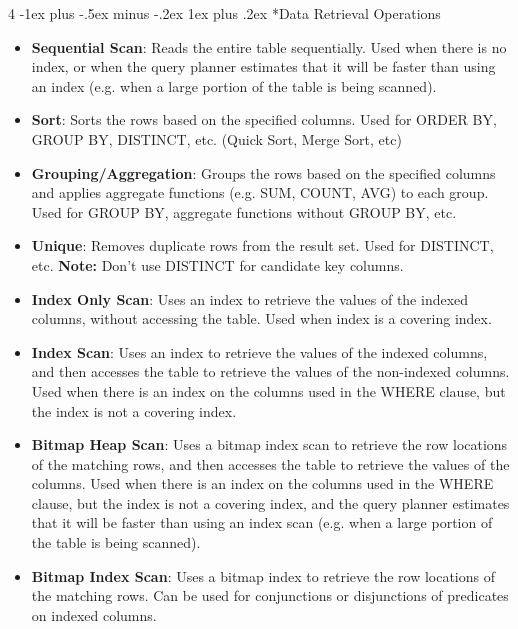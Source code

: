 \documentclass[10pt, landscape]{article}
\makeatletter
\renewcommand{\subsubsection}{\@startsection{subsubsection}{3}{0mm}%
  {-1ex plus -.5ex minus -.2ex}%
  {1ex plus .2ex}%
{\normalfont\small\bfseries}}%
\makeatother
\begin{document}
\begin{multicols*}{4}
  \subsubsection*{Data Retrieval Operations}
  \begin{itemize}
    \item \textbf{Sequential Scan}: Reads the entire table sequentially. Used when there is no index, or when the query planner estimates that it will be faster than using an index (e.g. when a large portion of the table is being scanned).
    \item \textbf{Sort}: Sorts the rows based on the specified columns. Used for ORDER BY, GROUP BY, DISTINCT, etc. (Quick Sort, Merge Sort, etc)
    \item \textbf{Grouping/Aggregation}: Groups the rows based on the specified columns and applies aggregate functions (e.g. SUM, COUNT, AVG) to each group. Used for GROUP BY, aggregate functions without GROUP BY, etc.
    \item \textbf{Unique}: Removes duplicate rows from the result set. Used for DISTINCT, etc. \textbf{Note:} Don't use DISTINCT for candidate key columns.
    \item \textbf{Index Only Scan}: Uses an index to retrieve the values of the indexed columns, without accessing the table. Used when index is a covering index.
    \item \textbf{Index Scan}: Uses an index to retrieve the values of the indexed columns, and then accesses the table to retrieve the values of the non-indexed columns. Used when there is an index on the columns used in the WHERE clause, but the index is not a covering index.
    \item \textbf{Bitmap Heap Scan}: Uses a bitmap index scan to retrieve the row locations of the matching rows, and then accesses the table to retrieve the values of the columns. Used when there is an index on the columns used in the WHERE clause, but the index is not a covering index, and the query planner estimates that it will be faster than using an index scan (e.g. when a large portion of the table is being scanned).
    \item \textbf{Bitmap Index Scan}: Uses a bitmap index to retrieve the row locations of the matching rows. Can be used for conjunctions or disjunctions of predicates on indexed columns.
  \end{itemize}


\end{multicols*}
\end{document}
